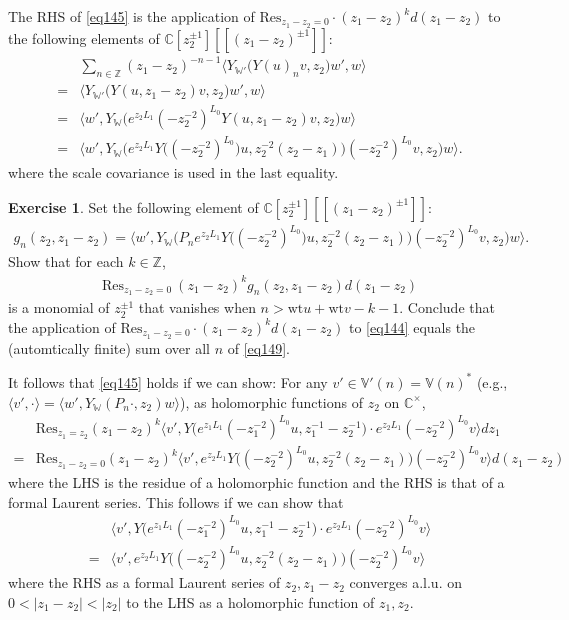 \documentclass[12pt,a4paper,notitlepage]{article}
\theoremstyle{definition}
\newtheorem{exe}[df]{Exercise}
\theoremstyle{plain}
\newcommand{\Res}{\mathrm{Res}}
\newcommand{\bk}[1]{\langle {#1}\rangle}
\newcommand{\bigbk}[1]{\big\langle {#1}\big\rangle}
\newcommand{\Bigbk}[1]{\Big\langle {#1}\Big\rangle}
\newcommand{\Vbb}{\mathbb V}
\newcommand{\Wbb}{\mathbb W}
\newcommand{\Cbb}{\mathbb C}
\newcommand{\Nbb}{\mathbb N}
\newcommand{\Zbb}{\mathbb Z}
\newcommand{\wt}{\mathrm{wt}}
\numberwithin{equation}{section}
\begin{document}
The RHS of \eqref{eq145} is the application of $\Res_{z_1-z_2=0}\cdot (z_1-z_2)^kd(z_1-z_2)$ to the following  elements of $\Cbb[z_2^{\pm1}][[(z_1-z_2)^{\pm1}]]$:
\begin{align}
&\sum_{n\in\Zbb}(z_1-z_2)^{-n-1}\bigbk{Y_{\Wbb'}\big(Y(u)_nv,z_2\big)w',w}\nonumber\\
=&\bigbk{Y_{\Wbb'}\big(Y(u,z_1-z_2)v,z_2\big)w',w}\nonumber\\
=&\bigbk{w',Y_\Wbb\big(e^{z_2L_1}(-z_2^{-2})^{L_0}Y(u,z_1-z_2)v,z_2\big)w}\nonumber\\
=&\bigbk{w',Y_\Wbb\big(e^{z_2L_1}Y\big((-z_2^{-2})^{L_0})u,z_2^{-2}(z_2-z_1)\big)(-z_2^{-2})^{L_0}v,z_2\big)w}.\label{eq144}
\end{align}
where the scale covariance is used in the last equality.
\begin{exe}
Set the following element of $\Cbb[z_2^{\pm1}][[(z_1-z_2)^{\pm1}]]$:
\begin{align*}
g_n(z_2,z_1-z_2)=\bigbk{w',Y_\Wbb\big(P_ne^{z_2L_1}Y\big((-z_2^{-2})^{L_0})u,z_2^{-2}(z_2-z_1)\big)(-z_2^{-2})^{L_0}v,z_2\big)w}.	
\end{align*}
Show that for each $k\in\Zbb$,
\begin{align}
\Res_{z_1-z_2=0}~(z_1-z_2)^kg_n(z_2,z_1-z_2)d(z_1-z_2)	\label{eq149}
\end{align}
is a monomial of $z_2^{\pm1}$ that vanishes when $n>\wt u+\wt v-k-1$. Conclude that the application of $\Res_{z_1-z_2=0}\cdot (z_1-z_2)^kd(z_1-z_2)$ to \eqref{eq144} equals the (automtically finite) sum over all $n$ of \eqref{eq149}.
\end{exe}


It follows that \eqref{eq145} holds 
if we can show: For any $v'\in\Vbb'(n)=\Vbb(n)^*$ (e.g.,  $\bk{v',\cdot}=\bk{w',Y_\Wbb(P_n\cdot,z_2)w}$), as holomorphic functions of $z_2$ on $\Cbb^\times$,
\begin{align}
&\Res_{z_1=z_2}(z_1-z_2)^k\bigbk{v',Y\big(e^{z_1L_1}(-z_1^{-2})^{L_0}u,z_1^{-1}-z_2^{-1}\big)\cdot e^{z_2L_1}(-z_2^{-2})^{L_0}v}dz_1\nonumber\\
=&	\Res_{z_1-z_2=0}(z_1-z_2)^k \bigbk{v',e^{z_2L_1}Y\big((-z_2^{-2})^{L_0}u,z_2^{-2}(z_2-z_1)\big)(-z_2^{-2})^{L_0}v}d(z_1-z_2)\label{eq146}
\end{align}
where the LHS is the residue of a holomorphic function and the RHS is that of a formal Laurent series. This follows if we can show that
\begin{align}
	&\bigbk{v',Y\big(e^{z_1L_1}(-z_1^{-2})^{L_0}u,z_1^{-1}-z_2^{-1}\big)\cdot e^{z_2L_1}(-z_2^{-2})^{L_0}v}\nonumber\\
	=&\bigbk{v',e^{z_2L_1}Y\big((-z_2^{-2})^{L_0}u,z_2^{-2}(z_2-z_1)\big)(-z_2^{-2})^{L_0}v}\label{eq148}
\end{align}
where the RHS as a formal Laurent series of $z_2,z_1-z_2$ converges a.l.u. on $0<|z_1-z_2|<|z_2|$ to the LHS as a holomorphic function of $z_1,z_2$.
\end{document}
